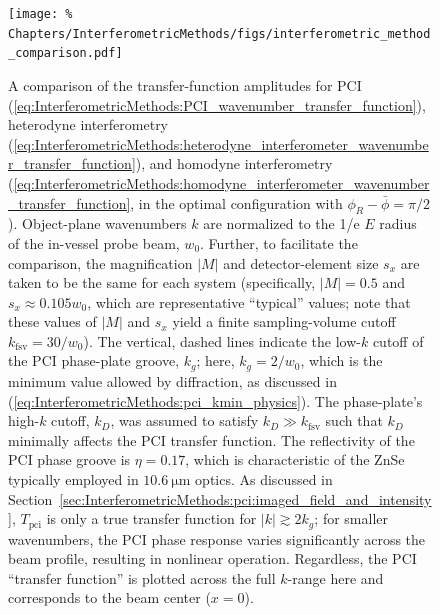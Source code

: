 \begin{figure}
  \centering
  \texttt{[image: \%
    Chapters/InterferometricMethods/figs/interferometric\_method\_comparison.pdf]}
  \caption[Comparison of interferometric method transfer functions]{%
    A comparison of the transfer-function amplitudes for
    PCI (\ref{eq:InterferometricMethods:PCI_wavenumber_transfer_function}),
    heterodyne interferometry
    (\ref{eq:InterferometricMethods:heterodyne_interferometer_wavenumber_transfer_function}),
    and homodyne interferometry
    (\ref{eq:InterferometricMethods:homodyne_interferometer_wavenumber_transfer_function},
    in the optimal configuration with $\phi_R - \bar{\phi} = \pi / 2$).
    Object-plane wavenumbers $k$ are normalized
    to the 1/e $E$ radius of the in-vessel probe beam, $w_0$.
    Further, to facilitate the comparison,
    the magnification $|M|$ and detector-element size $s_x$
    are taken to be the same for each system
    (specifically, $|M| = 0.5$ and $s_x \approx 0.105 w_0$,
    which are representative ``typical'' values;
    note that these values of $|M|$ and $s_x$
    yield a finite sampling-volume cutoff $k_{\text{fsv}} = 30 / w_0$).
    The vertical, dashed lines indicate
    the low-$k$ cutoff of the PCI phase-plate groove, $k_g$;
    here, $k_g = 2 / w_0$,
    which is the minimum value allowed by diffraction,
    as discussed in
    (\ref{eq:InterferometricMethods:pci_kmin_physics}).
    The phase-plate's high-$k$ cutoff, $k_D$, was assumed to satisfy
    $k_D \gg k_{\text{fsv}}$ such that
    $k_D$ minimally affects the PCI transfer function.
    The reflectivity of the PCI phase groove is $\eta = 0.17$,
    which is characteristic of the ZnSe typically
    employed in $\SI{10.6}{\micro\meter}$ optics.
    As discussed in
    Section~\ref{sec:InterferometricMethods:pci:imaged_field_and_intensity},
    $T_{\text{pci}}$ is only a true transfer function
    for $|k| \gtrsim 2 k_g$;
    for smaller wavenumbers, the PCI phase response
    varies significantly across the beam profile,
    resulting in nonlinear operation.
    Regardless, the PCI ``transfer function'' is plotted
    across the full $k$-range here and
    corresponds to the beam center ($x = 0$).
  }
\label{fig:InterferometricMethods:interferometric_method_transfer_functions}
\end{figure}

